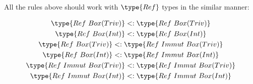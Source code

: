 \documentclass{article}
\newcommand\subtype{\mathrel{<:}}
\begin{document}
\medskip

All the rules above should work with $\type{Ref}$ types in the similar manner:

\begin{gather*}
  \type{Ref\ Box(Triv)}        \subtype \type{Ref\ Box(Triv)}\\
  \type{Ref\ Box(Int)}         \subtype \type{Ref\ Box(Int)}\\
  \type{Ref\ Box(Triv)}        \subtype \type{Ref\ Immut\ Box(Triv)}\\
  \type{Ref\ Box(Int)}         \subtype \type{Ref\ Immut\ Box(Int)}\\
  \type{Ref\ Immut\ Box(Triv)} \subtype \type{Ref\ Immut\ Box(Triv)}\\
  \type{Ref\ Immut\ Box(Int)}  \subtype \type{Ref\ Immut\ Box(Int)}
\end{gather*}

\end{document}
